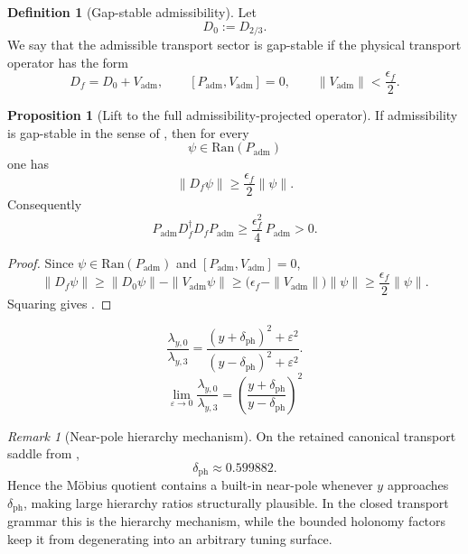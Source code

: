 \documentclass[11pt,a4paper]{article}
\theoremstyle{definition}
\newtheorem{definition}[theorem]{Definition}
\newtheorem{proposition}[theorem]{Proposition}
\theoremstyle{remark}
\newtheorem*{remark}{Remark}
\newcommand{\Padm}{P_{\mathrm{adm}}}
\begin{document}
\begin{definition}[Gap-stable admissibility]
\label{def:gap-stable-admissibility}
Let
\[
D_0:=D_{2/3}.
\]
We say that the admissible transport sector is gap-stable if the physical transport operator has the form
\[
D_f=D_0+V_{\mathrm{adm}},
\qquad
[\Padm,V_{\mathrm{adm}}]=0,
\qquad
\|V_{\mathrm{adm}}\|<\frac{\epsilon_f}{2}.
\]
\end{definition}

\begin{proposition}[Lift to the full admissibility-projected operator]
\label{prop:gap-lift-full-operator}
If admissibility is gap-stable in the sense of , then for every
\[
\psi\in\mathrm{Ran}(\Padm)
\]
one has
\[
\|D_f\psi\|
\ge
\frac{\epsilon_f}{2}\|\psi\|.
\]
Consequently
\begin{equation}
\label{eq:gap-lift-full-operator}
\Padm D_f^\dagger D_f \Padm
\ge
\frac{\epsilon_f^2}{4}\,\Padm
>
0.
\end{equation}
\end{proposition}

\begin{proof}
Since $\psi\in\mathrm{Ran}(\Padm)$ and $[\Padm,V_{\mathrm{adm}}]=0$,
\[
\|D_f\psi\|
\ge
\|D_0\psi\|-\|V_{\mathrm{adm}}\psi\|
\ge
\bigl(\epsilon_f-\|V_{\mathrm{adm}}\|\bigr)\|\psi\|
\ge
\frac{\epsilon_f}{2}\|\psi\|.
\]
Squaring gives .
\end{proof}

\begin{equation}
\label{eq:mobius-quotient}
\frac{\lambda_{y,0}}{\lambda_{y,3}}
=
\frac{(y+\delta_{\mathrm{ph}})^2+\varepsilon^2}{(y-\delta_{\mathrm{ph}})^2+\varepsilon^2}.
\end{equation}
\[
\lim_{\varepsilon\to 0}\frac{\lambda_{y,0}}{\lambda_{y,3}}
=
\left(\frac{y+\delta_{\mathrm{ph}}}{y-\delta_{\mathrm{ph}}}\right)^2
\]
\begin{remark}[Near-pole hierarchy mechanism]
On the retained canonical transport saddle from ,
\[
\delta_{\mathrm{ph}}\approx \num{0.599882}.
\]
Hence the Möbius quotient contains a built-in near-pole whenever $y$ approaches $\delta_{\mathrm{ph}}$, making large hierarchy ratios structurally plausible. In the closed transport grammar this is the hierarchy mechanism, while the bounded holonomy factors keep it from degenerating into an arbitrary tuning surface.
\end{remark}
\end{document}
